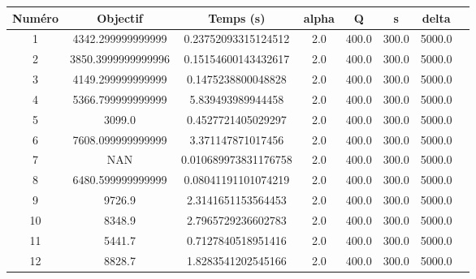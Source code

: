 \begin{tabular}{|c|c|c|c|c|c|c|c|}
\hline
 Numéro & Objectif & Temps (s) & alpha & Q & s & delta \\
\hline
1 & 4342.299999999999 & 0.23752093315124512 & 2.0 & 400.0 & 300.0 & 5000.0 \\ 
 \hline
2 & 3850.3999999999996 & 0.15154600143432617 & 2.0 & 400.0 & 300.0 & 5000.0 \\ 
 \hline
3 & 4149.299999999999 & 0.1475238800048828 & 2.0 & 400.0 & 300.0 & 5000.0 \\ 
 \hline
4 & 5366.799999999999 & 5.839493989944458 & 2.0 & 400.0 & 300.0 & 5000.0 \\ 
 \hline
5 & 3099.0 & 0.4527721405029297 & 2.0 & 400.0 & 300.0 & 5000.0 \\ 
 \hline
6 & 7608.099999999999 & 3.371147871017456 & 2.0 & 400.0 & 300.0 & 5000.0 \\ 
 \hline
7 & NAN & 0.010689973831176758 & 2.0 & 400.0 & 300.0 & 5000.0 \\ 
 \hline
8 & 6480.599999999999 & 0.08041191101074219 & 2.0 & 400.0 & 300.0 & 5000.0 \\ 
 \hline
9 & 9726.9 & 2.3141651153564453 & 2.0 & 400.0 & 300.0 & 5000.0 \\ 
 \hline
10 & 8348.9 & 2.7965729236602783 & 2.0 & 400.0 & 300.0 & 5000.0 \\ 
 \hline
11 & 5441.7 & 0.7127840518951416 & 2.0 & 400.0 & 300.0 & 5000.0 \\ 
 \hline
12 & 8828.7 & 1.8283541202545166 & 2.0 & 400.0 & 300.0 & 5000.0 \\ 
 \hline
\end{tabular}
